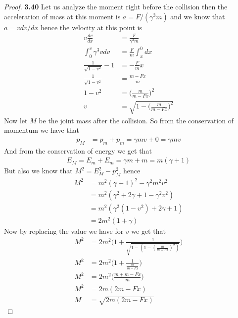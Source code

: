 \documentclass[11pt]{article}
\theoremstyle{definition}
\begin{document}
\begin{proof}{\textbf{3.40}}
    Let us analyze the moment right before the collision then the acceleration
    of mass at this moment is $a = F/(\gamma^3 m)$ and we know that
    $a = v dv/dx$ hence the velocity at this point is
    \begin{align*}
        v\frac{dv}{dx} &= \frac{F}{\gamma^3 m}\\
        \int_{0}^v \gamma^3 vdv &= \frac{F}{m} \int_x^0 dx\\
        \frac{1}{\sqrt{1 - v^2}} - 1 &= -\frac{F}{m} x\\
        \frac{1}{\sqrt{1 - v^2}} &= \frac{m - Fx}{m}\\
        1 - v^2 &= \bigg(\frac{m}{m - Fx}\bigg)^2\\
        v &= \sqrt{1- \bigg(\frac{m}{m - Fx}\bigg)^2}
    \end{align*}
    Now let $M$ be the joint mass after the collision.
    So from the conservation of momentum we have that
    \begin{align*}
        p_M &= p_m + p_m = \gamma m v + 0 = \gamma m v
    \end{align*}
    And from the conservation of energy we get that
    \begin{align*}
        E_M = E_m + E_m = \gamma m + m = m(\gamma + 1)
    \end{align*}
    But also we know that $M^2 = E_M^2 - p_M^2$ hence
    \begin{align*}
        M^2 &= m^2(\gamma + 1)^2  - \gamma^2 m^2 v^2\\
        &= m^2(\gamma^2 + 2\gamma + 1  - \gamma^2 v^2)\\
        &= m^2(\gamma^2(1 - v^2) + 2\gamma + 1)\\
        &= 2m^2(1 + \gamma)
    \end{align*}
    Now by replacing the value we have for $v$ we get that
    \begin{align*}
        M^2 &= 2m^2\bigg(1 + \frac{1}{\sqrt{1 - (1-(\frac{m}{m - Fx})^2)}}\bigg)\\
        M^2 &= 2m^2\bigg(1 + \frac{1}{\frac{m}{m - Fx}}\bigg)\\        
        M^2 &= 2m^2\bigg(\frac{m + m- Fx}{m}\bigg)\\        
        M^2 &= 2m(2m- Fx)\\        
        M &= \sqrt{2m(2m - Fx)}
    \end{align*}
\end{proof}
\cleardoublepage
\end{document}
